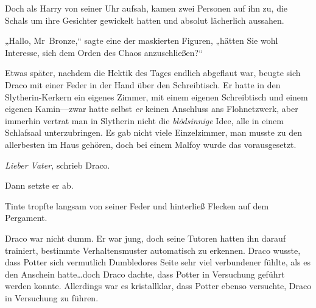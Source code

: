 Doch als Harry von seiner Uhr aufsah, kamen zwei Personen auf ihn zu, die Schals um ihre Gesichter gewickelt hatten und absolut lächerlich aussahen.

„Hallo, Mr~Bronze,“ sagte eine der maskierten Figuren, „hätten Sie wohl Interesse, sich dem Orden des Chaos anzuschließen?“


Etwas später, nachdem die Hektik des Tages endlich abgeflaut war, beugte sich Draco mit einer Feder in der Hand über den Schreibtisch. Er hatte in den Slytherin-Kerkern ein eigenes Zimmer, mit einem eigenen Schreibtisch und einem eigenen Kamin—zwar hatte selbst \emph{er} keinen Anschluss ans Flohnetzwerk, aber immerhin vertrat man in Slytherin nicht die \emph{blödsinnige} Idee, alle in einem Schlafsaal unterzubringen. Es gab nicht viele Einzelzimmer, man musste zu den allerbesten im Haus gehören, doch bei einem Malfoy wurde das vorausgesetzt.

\emph{Lieber Vater,} schrieb Draco.

Dann setzte er ab.

Tinte tropfte langsam von seiner Feder und hinterließ Flecken auf dem Pergament.

Draco war nicht dumm. Er war jung, doch seine Tutoren hatten ihn darauf trainiert, bestimmte Verhaltensmuster automatisch zu erkennen. Draco wusste, dass Potter sich vermutlich Dumbledores Seite sehr viel verbundener fühlte, als es den Anschein hatte…doch Draco dachte, dass Potter in Versuchung geführt werden konnte. Allerdings war es kristallklar, dass Potter ebenso versuchte, Draco in Versuchung zu führen.

